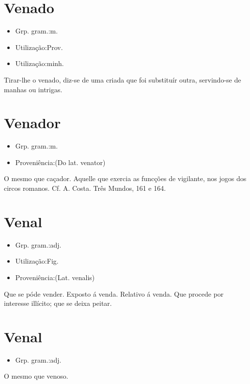 \documentclass{article}
\begin{document}
\section{Venado}
\begin{itemize}
\item {Grp. gram.:m.}
\end{itemize}
\begin{itemize}
\item {Utilização:Prov.}
\end{itemize}
\begin{itemize}
\item {Utilização:minh.}
\end{itemize}
\textunderscore Tirar-lhe o venado\textunderscore , diz-se de uma criada que foi substituír outra, servindo-se de manhas ou intrigas.
\section{Venador}
\begin{itemize}
\item {Grp. gram.:m.}
\end{itemize}
\begin{itemize}
\item {Proveniência:(Do lat. \textunderscore venator\textunderscore )}
\end{itemize}
O mesmo que \textunderscore caçador\textunderscore .
Aquelle que exercia as funcções de vigilante, nos jogos dos circos romanos. Cf. A. Costa. \textunderscore Três Mundos\textunderscore , 161 e 164.
\section{Venal}
\begin{itemize}
\item {Grp. gram.:adj.}
\end{itemize}
\begin{itemize}
\item {Utilização:Fig.}
\end{itemize}
\begin{itemize}
\item {Proveniência:(Lat. \textunderscore venalis\textunderscore )}
\end{itemize}
Que se póde vender.
Exposto á venda.
Relativo á venda.
Que procede por interesse illícito; que se deixa peitar.
\section{Venal}
\begin{itemize}
\item {Grp. gram.:adj.}
\end{itemize}
O mesmo que \textunderscore venoso\textunderscore .
\end{document}
